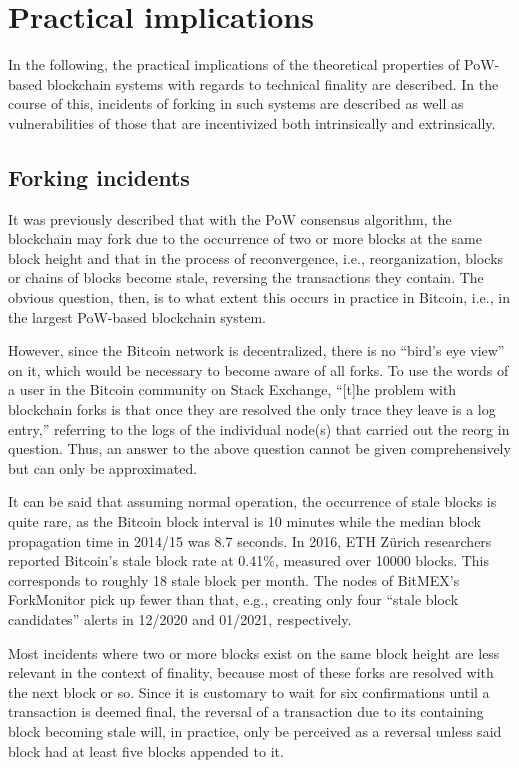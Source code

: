 \section{Practical implications}

In the following, the practical implications of the theoretical properties of PoW-based blockchain systems with regards to technical finality are described.
In the course of this, incidents of forking in such systems are described as well as vulnerabilities of those that are incentivized both intrinsically and extrinsically.

\subsection{Forking incidents}

It was previously described that with the PoW consensus algorithm, the blockchain may fork due to the occurrence of two or more blocks at the same block height and that in the process of reconvergence, i.e., reorganization, blocks or chains of blocks become stale, reversing the transactions they contain.
The obvious question, then, is to what extent this occurs in practice in Bitcoin, i.e., in the largest PoW-based blockchain system.

However, since the Bitcoin network is decentralized, there is no ``bird's eye view'' on it, which would be necessary to become aware of all forks.
To use the words of a user in the Bitcoin community on Stack Exchange, ``[t]he problem with blockchain forks is that once they are resolved the only trace they leave is a log entry,'' \autocite{stackexchange2017bitcoinforks} referring to the logs of the individual node(s) that carried out the reorg in question.
Thus, an answer to the above question cannot be given comprehensively but can only be approximated.

It can be said that assuming normal operation, the occurrence of stale blocks is quite rare, as the Bitcoin block interval is 10 minutes while the median block propagation time in 2014/15 was 8.7 seconds. \autocite[7]{croman2016}
In 2016, ETH Zürich researchers reported Bitcoin's stale block rate at 0.41\%, measured over 10000 blocks. \autocite[3]{gervais2016}
This corresponds to roughly 18 stale block per month.
The nodes of BitMEX's ForkMonitor pick up fewer than that, e.g., creating only four ``stale block candidates'' alerts in 12/2020 and 01/2021, respectively. \autocite{forkmonitor2021staleblocks}

Most incidents where two or more blocks exist on the same block height are less relevant in the context of finality, because most of these forks are resolved with the next block or so.
Since it is customary to wait for six confirmations until a transaction is deemed final, the reversal of a transaction due to its containing block becoming stale will, in practice, only be perceived as a reversal unless said block had at least five blocks appended to it.

